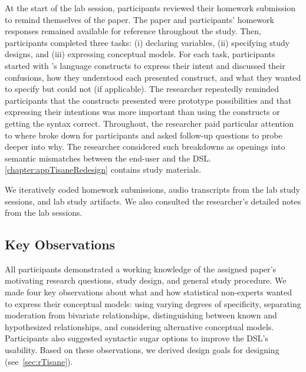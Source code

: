 
At the start of the lab session, participants reviewed their homework submission
to remind themselves of the paper. The paper and participants' homework
responses remained available for reference throughout the study. Then,
participants completed three tasks: (i) declaring variables, (ii) specifying
study designs, and (iii) expressing conceptual models. For each task,
participants started with \tisane's language constructs to express their intent
and discussed their confusions, how they understood each presented construct,
and what they wanted to specify but could not (if applicable). The researcher
repeatedly reminded participants that the constructs presented were prototype
possibilities and that expressing their intentions was more important than using
the constructs or getting the syntax correct. Throughout, the researcher paid
particular attention to where \tisane broke down for participants and asked
follow-up questions to probe deeper into why. The researcher considered such
breakdowns as openings into semantic mismatches between the end-user and the
DSL. \autoref{chapter:appTisaneRedesign} contains study materials.

We iteratively coded homework submissions, audio transcripts from the lab study
sessions, and lab study artifacts. We also consulted the
researcher's detailed notes from the lab sessions. 


\subsection{Key Observations}
All participants demonstrated a working knowledge of the assigned paper's
motivating research questions, study design, and general study procedure. 
We made four key observations about what and how statistical non-experts wanted
to express their conceptual models: using varying degrees of specificity,
separating moderation from bivariate relationships, distinguishing between known
and hypothesized relationships, and considering alternative conceptual models.
Participants also suggested syntactic sugar options to improve the DSL's
usability. Based on these observations, we derived design goals for designing
\rTisane (see~\autoref{sec:rTisane}).

